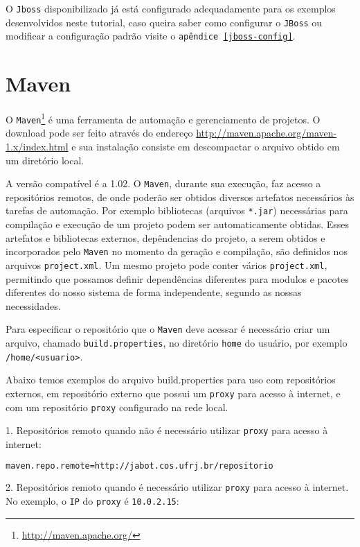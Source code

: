O \texttt{Jboss} disponibilizado já está configurado adequadamente para os
exemplos desenvolvidos neste tutorial, caso queira saber como configurar o
\texttt{JBoss} ou modificar a configuração padrão visite o \texttt{apêndice
\ref{jboss-config}}.

\section{Maven}
O
\texttt{Maven}\footnote{\href{http://maven.apache.org/}{http://maven.apache.org/}}
é uma ferramenta de automação e gerenciamento de projetos. O download pode ser
feito através do endereço
\href{http://maven.apache.org/maven-1.x/index.html}{http://maven.apache.org/maven-1.x/index.html}
e sua instalação consiste em descompactar o arquivo obtido em um diretório
local.

A versão compatível é a 1.02. O \texttt{Maven}, durante sua execução, faz acesso
a repositórios remotos, de onde poderão ser obtidos diversos artefatos
necessários às tarefas de automação. Por exemplo bibliotecas (arquivos
\texttt{*.jar}) necessárias para compilação e execução de um projeto podem ser
automaticamente obtidas. Esses artefatos e bibliotecas externos, depêndencias do
projeto, a serem obtidos e incorporados pelo \texttt{Maven} no momento da
geração e compilação, são definidos nos arquivos \texttt{project.xml}. Um mesmo
projeto pode conter vários \texttt{project.xml}, permitindo que possamos definir
dependências diferentes para modulos e pacotes diferentes do nosso sistema de
forma independente, segundo as nossas necessidades.

Para especificar o repositório que o \texttt{Maven} deve acessar é necessário
criar um arquivo, chamado \texttt{build.properties}, no diretório \texttt{home}
do usuário, por exemplo \texttt{/home/<usuario>}.

Abaixo temos exemplos do arquivo build.properties para uso com repositórios
externos, em repositório externo que possui um \texttt{proxy} para acesso à
internet, e com um repositório \texttt{proxy} configurado na rede local.

1. Repositórios remoto quando não é necessário utilizar \texttt{proxy} para
acesso à internet:

\begin{lstlisting}[language=bash]
maven.repo.remote=http://jabot.cos.ufrj.br/repositorio 
\end{lstlisting}

2. Repositórios remoto quando é necessário utilizar \texttt{proxy} para acesso à
internet. No exemplo, o \texttt{IP} do \texttt{proxy} é \texttt{10.0.2.15}:

